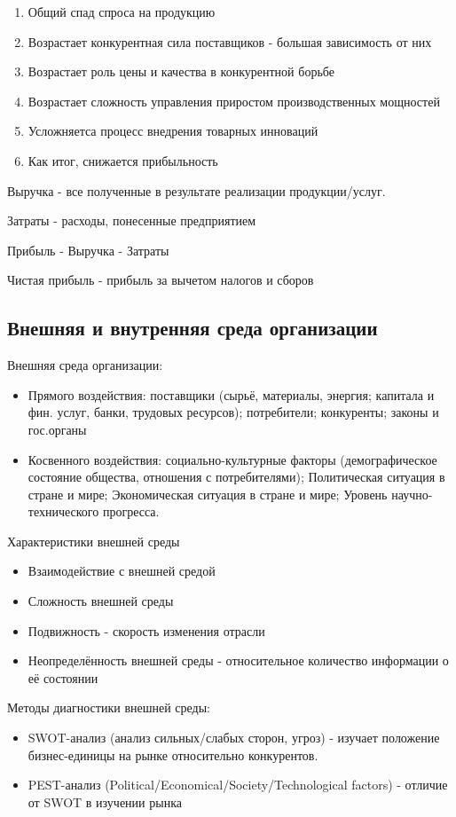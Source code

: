 \documentclass[a4paper,12pt]{report}
\begin{document}
	\begin{enumerate}
		\item	Общий спад спроса на продукцию
		\item	Возрастает конкурентная сила поставщиков - большая зависимость от них
		\item 	Возрастает роль цены и качества в конкурентной борьбе
		\item	Возрастает сложность управления приростом производственных мощностей
		\item	Усложняетса процесс внедрения товарных инноваций
		\item	Как итог, снижается прибыльность
	\end{enumerate}

	Выручка - все полученные в результате реализации продукции/услуг.

	Затраты - расходы, понесенные предприятием

	Прибыль - Выручка - Затраты

	Чистая прибыль - прибыль за вычетом налогов и сборов


\subsection{Внешняя и внутренняя среда организации}

	Внешняя среда организации:
	\begin{itemize}
		\item	Прямого воздействия: поставщики (сырьё, материалы, энергия; капитала и фин. услуг, банки, трудовых ресурсов); потребители; конкуренты; законы и гос.органы
		\item	Косвенного воздействия: социально-культурные факторы (демографическое состояние общества, отношения с потребителями); Политическая ситуация в стране и мире; Экономическая ситуация в стране и мире; Уровень научно-технического прогресса.
	\end{itemize}

	Характеристики внешней среды
	\begin{itemize}
		\item	Взаимодействие с внешней средой
		\item	Сложность внешней среды
		\item	Подвижность - скорость изменения отрасли
		\item	Неопределённость внешней среды - относительное количество информации о её состоянии
	\end{itemize}

	Методы диагностики внешней среды:
	\begin{itemize}
		\item	SWOT-анализ (анализ сильных/слабых сторон, угроз) - изучает положение бизнес-единицы на рынке относительно конкурентов.
		\item	PEST-анализ (Political/Economical/Society/Technological factors) - отличие от SWOT в изучении рынка
	\end{itemize}
\end{document}
